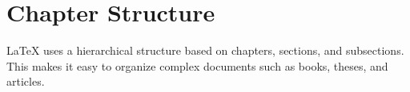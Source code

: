 \section{Chapter Structure}
LaTeX uses a hierarchical structure based on chapters, sections, and subsections. This makes it easy to organize complex documents such as books, theses, and articles.
